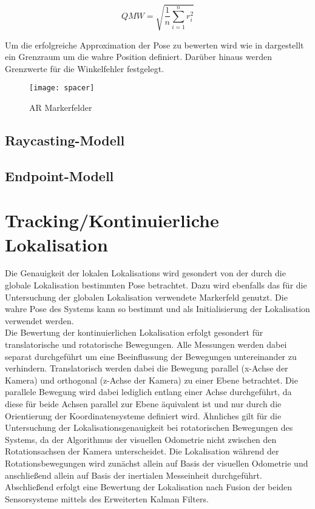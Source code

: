 \begin{equation}
QMW = \sqrt{\frac{1}{n}\sum_{i=1}^nr_i^2}
\end{equation}

Um die erfolgreiche Approximation der Pose zu bewerten wird wie in  dargestellt ein Grenzraum um die wahre Position definiert. Darüber hinaus werden Grenzwerte für die Winkelfehler festgelegt. 

\begin{figure}[!ht]
	\begin{center}
		\texttt{[image: spacer]}
		\caption{AR Markerfelder}
		\label{fig.armarker}
	\end{center}
\end{figure}


\subsection{Raycasting-Modell}

\subsection{Endpoint-Modell}


\section{Tracking/Kontinuierliche Lokalisation}
Die Genauigkeit der lokalen Lokalisations wird gesondert von der durch die globale Lokalisation bestimmten Pose betrachtet. Dazu wird ebenfalls das für die Untersuchung der globalen Lokalisation verwendete Markerfeld genutzt. Die wahre Pose des Systems kann so bestimmt und als Initialisierung der Lokalisation verwendet werden.\\
Die Bewertung der kontinuierlichen Lokalisation erfolgt gesondert für translatorische und rotatorische Bewegungen. Alle Messungen werden dabei separat durchgeführt um eine Beeinflussung der Bewegungen untereinander zu verhindern. Translatorisch werden dabei die Bewegung parallel (x-Achse der Kamera) und orthogonal (z-Achse der Kamera) zu einer Ebene betrachtet. Die parallele Bewegung wird dabei lediglich entlang einer Achse durchgeführt, da diese für beide Achsen parallel zur Ebene äquivalent ist und nur durch die Orientierung der Koordinatensysteme definiert wird. Ähnliches gilt für die Untersuchung der Lokalisationsgenauigkeit bei rotatorischen Bewegungen des Systems, da der Algorithmus der visuellen Odometrie nicht zwischen den Rotationsachsen der Kamera unterscheidet. Die Lokalisation während der Rotationsbewegungen wird zunächst allein auf Basis der visuellen Odometrie und anschließend allein auf Basis der inertialen Messeinheit durchgeführt. Abschließend erfolgt eine Bewertung der Lokalisation nach Fusion der beiden Sensorsysteme mittels des Erweiterten Kalman Filters.

